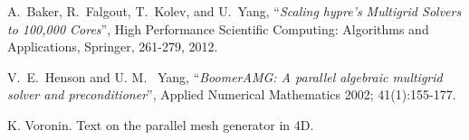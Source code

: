 \documentclass[a4paper,12pt]{amsart}
\numberwithin{equation}{section}
\begin{document}
\begin{thebibliography}{99}
{\sc A.~Baker, R.~Falgout, T.~Kolev, and U.~Yang,} 
``{\em Scaling hypre's Multigrid Solvers to 100,000 Cores}'',
High Performance Scientific Computing: Algorithms and Applications, Springer,  261-279, 2012.

{\sc V.~E.~Henson and U. M.~ Yang,} ``{\em Boomer{AMG}: A parallel algebraic multigrid solver and preconditioner}'',
Applied Numerical Mathematics 2002; 41(1):155-177.

K. Voronin. Text on the parallel mesh generator in 4D.

\end{thebibliography}
\end{document}
